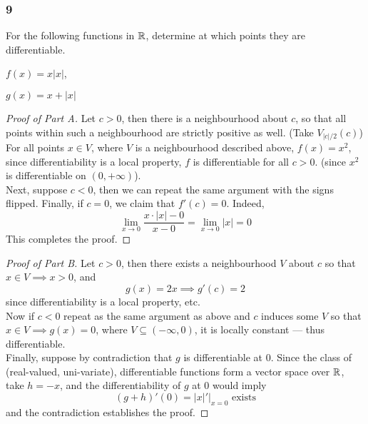 \documentclass[../main.tex]{subfiles}
\begin{document}
\providecommand{\cant}{\mathcal{C}}
\providecommand{\diam}{\operatorname{diam}}
\subsubsection*{9}
\begin{wts}
For the following functions in $\mathbb{R}$, determine at which points they are differentiable.
\begin{enumalpha}
    \item $f(x)= x|x|$,
    \item $g(x) = x + |x|$
\end{enumalpha}
\end{wts}
\begin{proof}[Proof of Part A]
    Let $c>0$, then there is a neighbourhood about $c$, so that all points within such a neighbourhood are strictly positive as well. (Take $V_{|c|/2}(c)$)\\
    
    For all points $x\in V$, where $V$ is a neighbourhood described above, $f(x)=x^2$, since differentiability is a local property, $f$ is differentiable for all $c>0$. (since $x^2$ is differentiable on $(0,+\infty)$).\\
    
    Next, suppose $c<0$, then we can repeat the same argument with the signs flipped. Finally, if $c=0$, we claim that $f'(c)=0$. Indeed,
    \[
        \lim_{x\to 0}\dfrac{x\cdot|x|-0}{x-0}=\lim_{x\to 0}|x|=0
    \]
    This completes the proof.
\end{proof}
\begin{proof}[Proof of Part B]
    Let $c>0$, then there exists a neighbourhood $V$ about $c$ so that $x\in V\implies x>0$, and
    \[g(x) = 2x\implies g'(c)=2\]
    since differentiability is a local property, etc.\\
    
    Now if $c<0$ repeat as the same argument as above and $c$ induces some $V$ so that $x\in V\implies g(x)=0$, where $V\subseteq (-\infty,0)$, it is locally constant — thus differentiable.\\
    
    Finally, suppose by contradiction that $g$ is differentiable at $0$. Since the class of (real-valued, uni-variate), differentiable functions form a vector space over $\mathbb{R}$, take $h = -x$, and the differentiability of $g$ at $0$ would imply
    \[(g+h)'(0)=|x|'|_{x=0}\text{ exists}\]
    and the contradiction establishes the proof.
\end{proof}
\end{document}
